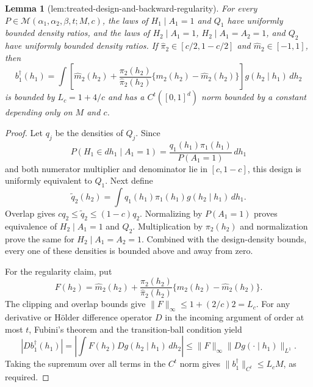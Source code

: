\documentclass{article}
\newtheorem{lemma}{Lemma}
\begin{document}
\begin{lemma}[lem:treated-design-and-backward-regularity]\label{lem:treated-design-and-backward-regularity}
For every \(P\in\mathcal M(\alpha_1,\alpha_2,\beta,t;M,c)\), the laws of \(H_1\mid A_1=1\) and \(Q_1\) have uniformly bounded density ratios, and the laws of \(H_2\mid A_1=1\), \(H_2\mid A_1=A_2=1\), and \(Q_2\) have uniformly bounded density ratios. If \(\widehat\pi_2\in[c/2,1-c/2]\) and \(\widehat m_2\in[-1,1]\), then
\[
b_1^\dagger(h_1)=\int\left[\widehat m_2(h_2)+\frac{\pi_2(h_2)}{\widehat\pi_2(h_2)}\{m_2(h_2)-\widehat m_2(h_2)\}\right]g(h_2\mid h_1)\,dh_2
\]
is bounded by \(L_c=1+4/c\) and has a \(C^t([0,1]^d)\) norm bounded by a constant depending only on \(M\) and \(c\).
\end{lemma}
\begin{proof}
Let \(q_j\) be the densities of \(Q_j\). Since
\[
P(H_1\in dh_1\mid A_1=1)=\frac{q_1(h_1)\pi_1(h_1)}{P(A_1=1)}\,dh_1
\]
and both numerator multiplier and denominator lie in \([c,1-c]\), this design is uniformly equivalent to \(Q_1\). Next define
\[
\widetilde q_2(h_2)=\int q_1(h_1)\pi_1(h_1)g(h_2\mid h_1)\,dh_1.
\]
Overlap gives \(cq_2\le\widetilde q_2\le(1-c)q_2\). Normalizing by \(P(A_1=1)\) proves equivalence of \(H_2\mid A_1=1\) and \(Q_2\). Multiplication by \(\pi_2(h_2)\) and normalization prove the same for \(H_2\mid A_1=A_2=1\). Combined with the design-density bounds, every one of these densities is bounded above and away from zero.

For the regularity claim, put
\[
F(h_2)=\widehat m_2(h_2)+\frac{\pi_2(h_2)}{\widehat\pi_2(h_2)}\{m_2(h_2)-\widehat m_2(h_2)\}.
\]
The clipping and overlap bounds give \(\|F\|_\infty\le1+(2/c)2=L_c\). For any derivative or H\"older difference operator \(D\) in the incoming argument of order at most \(t\), Fubini's theorem and the transition-ball condition yield
\[
|D b_1^\dagger(h_1)|=\left|\int F(h_2)Dg(h_2\mid h_1)\,dh_2\right|\le\|F\|_\infty\|Dg(\cdot\mid h_1)\|_{L^1}.
\]
Taking the supremum over all terms in the \(C^t\) norm gives \(\|b_1^\dagger\|_{C^t}\le L_cM\), as required.
\end{proof}
\end{document}
